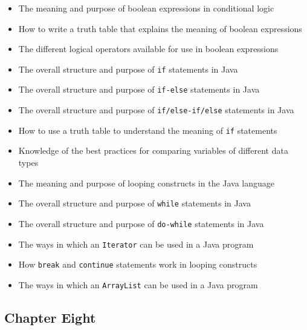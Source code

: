 \begin{itemize}

  \itemsep -.015in
  \item The meaning and purpose of boolean expressions in conditional logic
  \item How to write a truth table that explains the meaning of boolean expressions
  \item The different logical operators available for use in boolean expressions
  \item The overall structure and purpose of {\tt if} statements in Java
  \item The overall structure and purpose of {\tt if-else} statements in Java
  \item The overall structure and purpose of {\tt if/else-if/else} statements in Java
  \item How to use a truth table to understand the meaning of {\tt if} statements
  \item Knowledge of the best practices for comparing variables of different data types
  \item The meaning and purpose of looping constructs in the Java language
  \item The overall structure and purpose of {\tt while} statements in Java
  \item The overall structure and purpose of {\tt do-while} statements in Java
  \item The ways in which an {\tt Iterator} can be used in a Java program
  \item How {\tt break} and {\tt continue} statements work in looping constructs
  \item The ways in which an {\tt ArrayList} can be used in a Java program

\end{itemize}

\vspace*{-.15in}
\subsection*{Chapter Eight}

